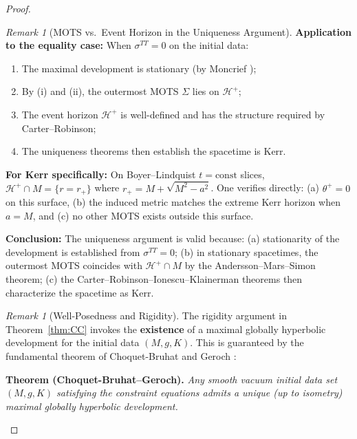 \documentclass[12pt]{article}
\theoremstyle{plain}
\theoremstyle{definition}
\theoremstyle{remark}
\newtheorem{remark}[theorem]{Remark}
\begin{document}
\begin{proof}
\begin{remark}[MOTS vs.\ Event Horizon in the Uniqueness Argument]
\textbf{Application to the equality case:} When $\sigma^{TT} = 0$ on the initial data:
\begin{enumerate}
    \item The maximal development is stationary (by Moncrief \cite{moncrief1975});
    \item By (i) and (ii), the outermost MOTS $\Sigma$ lies on $\mathcal{H}^+$;
    \item The event horizon $\mathcal{H}^+$ is well-defined and has the structure required by Carter--Robinson;
    \item The uniqueness theorems then establish the spacetime is Kerr.
\end{enumerate}

\textbf{For Kerr specifically:} On Boyer--Lindquist $t = \text{const}$ slices, $\mathcal{H}^+ \cap M = \{r = r_+\}$ where $r_+ = M + \sqrt{M^2 - a^2}$. One verifies directly: (a) $\theta^+ = 0$ on this surface, (b) the induced metric matches the extreme Kerr horizon when $a = M$, and (c) no other MOTS exists outside this surface.

\textbf{Conclusion:} The uniqueness argument is valid because: (a) stationarity of the development is established from $\sigma^{TT} = 0$; (b) in stationary spacetimes, the outermost MOTS coincides with $\mathcal{H}^+ \cap M$ by the Andersson--Mars--Simon theorem; (c) the Carter--Robinson--Ionescu--Klainerman theorems then characterize the spacetime as Kerr.
\end{remark}

\begin{remark}[Well-Posedness and Rigidity]\label{rem:well-posedness}
The rigidity argument in Theorem~\ref{thm:CC} invokes the \textbf{existence} of a maximal globally hyperbolic development for the initial data $(M, g, K)$. This is guaranteed by the fundamental theorem of Choquet-Bruhat and Geroch \cite{choquetbruhat1969}:

\textbf{Theorem (Choquet-Bruhat--Geroch).} \textit{Any smooth vacuum initial data set $(M, g, K)$ satisfying the constraint equations admits a unique (up to isometry) maximal globally hyperbolic development.}


\end{remark}
\end{proof}
\end{document}
